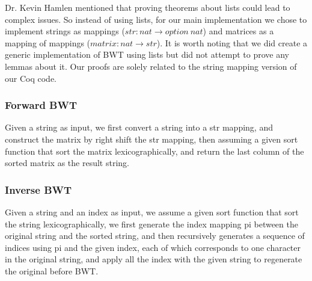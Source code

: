 \documentclass[11pt,letterpaper,titlepage]{article}
\begin{document}
Dr. Kevin Hamlen mentioned that proving theorems about lists could lead to
complex issues. So instead of using lists, for our main implementation we chose
to implement strings as mappings ($str: nat \rightarrow option\ nat$) and
matrices as a mapping of mappings ($matrix: nat \rightarrow str$). It is worth
noting that we did create a generic implementation of BWT using lists but did
not attempt to prove any lemmas about it. Our proofs are solely related to the
string mapping version of our Coq code.

\subsubsection{Forward BWT}

Given a string as input, we first convert a string into a str mapping, and
construct the matrix by right shift the str mapping, then assuming a given sort
function that sort the matrix lexicographically, and return the last column of
the sorted matrix as the result string.

\subsubsection{Inverse BWT}

Given a string and an index as input, we assume a given sort function that sort
the string lexicographically, we first generate the index mapping pi between
the original string and the sorted string, and then recursively generates a
sequence of indices using pi and the given index, each of which corresponds to
one character in the original string, and apply all the index with the given
string to regenerate the original before BWT.
\end{document}
